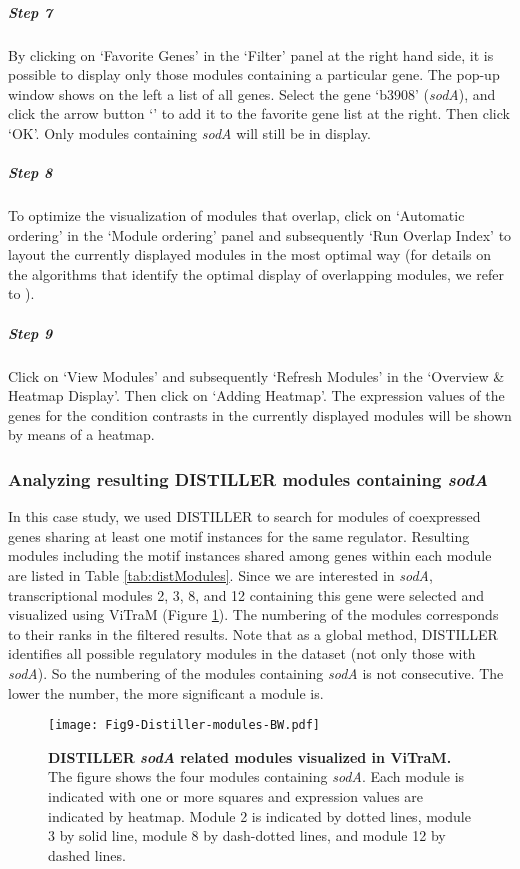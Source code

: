 \begin{small}
\subparagraph{Step 7} By clicking on `Favorite Genes' in the `Filter' panel 
at the right hand side, it is possible to display only those modules containing
a particular gene.
%
The pop-up window shows on the left a list of all genes. Select the gene
`b3908' (\textit{sodA}), and click the arrow button `\textrightarrow' to add it
to the favorite gene list at the right.  Then click `OK'.  Only modules
containing \textit{sodA} will still be in display.

\subparagraph{Step 8} To optimize the visualization of modules that overlap, 
click on `Automatic ordering' in the `Module ordering' panel and subsequently
`Run Overlap Index' to layout the currently displayed modules in the most
optimal way (for details on the algorithms that identify the optimal display of
overlapping modules, we refer to \cite{Sun2009}).

\subparagraph{Step 9} Click on `View Modules' and subsequently `Refresh 
Modules' in the `Overview \& Heatmap Display'. Then click on `Adding Heatmap'. 
The expression values of the genes for the condition contrasts in the currently 
displayed modules will be shown by means of a heatmap.

\end{small} %


\subsubsection{Analyzing resulting DISTILLER modules containing \textit{sodA}}

In this case study, we used DISTILLER to search for modules of coexpressed
genes sharing at least one motif instances for the same regulator.  Resulting
modules including the motif instances shared among genes within each module are
listed in Table \ref{tab:distModules}.  Since we are interested in
\textit{sodA}, transcriptional modules 2, 3, 8, and 12 containing this gene
were selected and visualized using ViTraM (Figure \ref{fig:vitram}).  
%
The numbering of the modules corresponds to their ranks in the filtered
results. Note that as a global method, DISTILLER identifies all possible
regulatory modules in the dataset (not only those with \textit{sodA}). So the
numbering of the modules containing \textit{sodA} is not consecutive. The lower
the number, the more significant a module is.

\begin{figure}[b]
	\centering
  	\texttt{[image: Fig9-Distiller-modules-BW.pdf]}
	\caption[DISTILLER \textit{sodA} related modules visualized in ViTraM] 
	{\textbf{DISTILLER \textit{sodA} related modules visualized in ViTraM.}
	The figure shows the four modules containing \textit{sodA}. Each module is 
	indicated with one or more squares and expression values are indicated by 
	heatmap. Module 2 is indicated by dotted lines, module 3 by solid line, 
	module 8 by dash-dotted lines, and module 12 by dashed lines.}
	\label{fig:vitram}
\end{figure}

